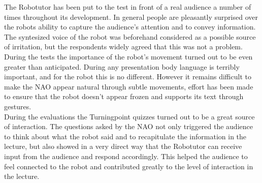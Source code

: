 The Robotutor has been put to the test in front of a real audience a number of times throughout its development. In general people are pleasantly surprised over the robots ability to capture the audience's attention and to convey information. The syntesized voice of the robot was beforehand considered as a possible source of irritation, but the respondents widely agreed that this was not a problem. During the tests the importance of the robot's movement turned out to be even greater than anticipated. During any presentation body language is terribly important, and for the robot this is no different. However it remains difficult to make the NAO appear natural through subtle movements, effort has been made to ensure that the robot doesn't appear frozen and supports its text through gestures. \\

During the evaluations the Turningpoint quizzes turned out to be a great source of interaction. The questions asked by the NAO  not only triggered the audience to think about what the robot said and to recapitulate the information in the lecture, but also showed in a very direct way that the Robotutor can receive input from the audience and respond accordingly. This helped the audience to feel connected to the robot and contributed greatly to the level of interaction in the lecture.